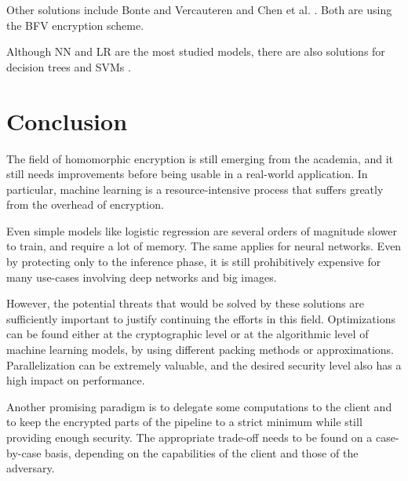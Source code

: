 \documentclass[a4paper,11pt,oneside]{report}
\begin{document}
Other solutions include Bonte and Vercauteren \cite{bonte_privacy-preserving_2018} and Chen et al. \cite{chen_logistic_2018}.
Both are using the BFV encryption scheme.

Although NN and LR are the most studied models, there are also solutions for decision trees \cite{akavia_privacy-preserving_2019} and SVMs \cite{park_he-friendly_2020}.


\chapter{Conclusion}


The field of homomorphic encryption is still emerging from the academia, and it still needs improvements before being usable in a real-world application. 
In particular, machine learning is a resource-intensive process that suffers greatly from the overhead of encryption.

Even simple models like logistic regression are several orders of magnitude slower to train, and require a lot of memory. 
The same applies for neural networks. Even by protecting only to the inference phase, it is still prohibitively expensive for many use-cases involving deep networks and big images.

However, the potential threats that would be solved by these solutions are sufficiently important to justify continuing the efforts in this field.
Optimizations can be found either at the cryptographic level or at the algorithmic level of machine learning models, by using different packing methods or approximations.
Parallelization can be extremely valuable, and the desired security level also has a high impact on performance.

Another promising paradigm is to delegate some computations to the client and to keep the encrypted parts of the pipeline to a strict minimum while still providing enough security. 
The appropriate trade-off needs to be found on a case-by-case basis, depending on the capabilities of the client and those of the adversary.


\cleardoublepage
{}
{}
\printbibliography
\end{document}
